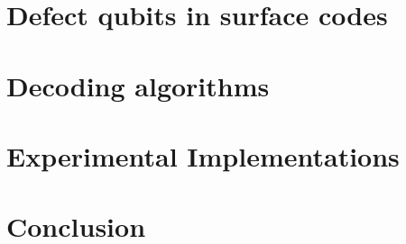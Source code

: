\documentclass[conference]{IEEEtran}
\begin{document}
\section{Defect qubits in surface codes}


\section{Decoding algorithms}

\section{Experimental Implementations}


\section{Conclusion}


\pagebreak
\printbibliography
\end{document}
